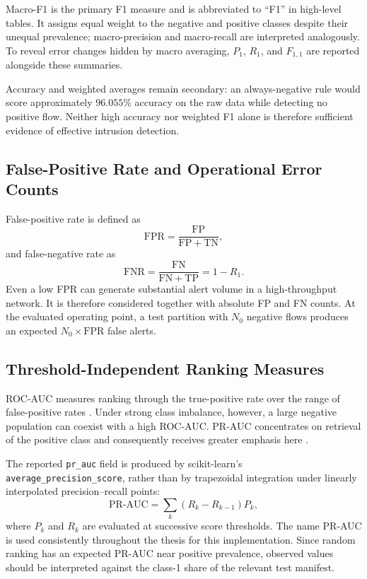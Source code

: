 \documentclass[11pt,fleqn]{report}
\begin{document}
Macro-F1 is the primary F1 measure and is abbreviated to ``F1'' in high-level tables. It assigns equal weight to the negative and positive classes despite their unequal prevalence; macro-precision and macro-recall are interpreted analogously. To reveal error changes hidden by macro averaging, $P_1$, $R_1$, and $F_{1,1}$ are reported alongside these summaries.

Accuracy and weighted averages remain secondary: an always-negative rule would score approximately $96.055\%$ accuracy on the raw data while detecting no positive flow. Neither high accuracy nor weighted F1 alone is therefore sufficient evidence of effective intrusion detection.

\subsection{False-Positive Rate and Operational Error Counts}
\label{subsubsec:fpr_metric}

False-positive rate is defined as
\begin{equation}
    \mathrm{FPR}=\frac{\mathrm{FP}}{\mathrm{FP}+\mathrm{TN}},
    \label{eq:false_positive_rate}
\end{equation}
and false-negative rate as
\begin{equation}
    \mathrm{FNR}=\frac{\mathrm{FN}}{\mathrm{FN}+\mathrm{TP}}
    =1-R_1.
    \label{eq:false_negative_rate}
\end{equation}
Even a low FPR can generate substantial alert volume in a high-throughput network. It is therefore considered together with absolute FP and FN counts. At the evaluated operating point, a test partition with $N_0$ negative flows produces an expected $N_0\times\mathrm{FPR}$ false alerts.

\subsection{Threshold-Independent Ranking Measures}
\label{subsubsec:ranking_metrics}

ROC-AUC measures ranking through the true-positive rate over the range of false-positive rates \cite{Fawcett2006ROC}. Under strong class imbalance, however, a large negative population can coexist with a high ROC-AUC. PR-AUC concentrates on retrieval of the positive class and consequently receives greater emphasis here \cite{SaitoRehmsmeier2015}.

The reported \texttt{pr\_auc} field is produced by scikit-learn's \texttt{average\_precision\_score}, rather than by trapezoidal integration under linearly interpolated precision--recall points:
\begin{equation}
    \mathrm{PR\mbox{-}AUC}=\sum_{k}(R_k-R_{k-1})P_k,
    \label{eq:average_precision}
\end{equation}
where $P_k$ and $R_k$ are evaluated at successive score thresholds. The name PR-AUC is used consistently throughout the thesis for this implementation. Since random ranking has an expected PR-AUC near positive prevalence, observed values should be interpreted against the class-1 share of the relevant test manifest.
\end{document}
